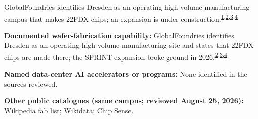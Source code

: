 \begin{minipage}[t][0.90\textheight][t]{\textwidth}
\begin{minipage}[t]{\textwidth}
\begin{minipage}[t]{0.32\textwidth}
\medskip
{\footnotesize GlobalFoundries identifies Dresden as an operating high-volume manufacturing campus that makes 22FDX chips; an expansion is under construction.\nobreak\textsuperscript{\href{\detokenize{https://www.openstreetmap.org/way/10818500}}{\textcolor{accent}{1}},\href{\detokenize{https://investors.gf.com/static-files/ef3116da-5334-46e0-9b6c-56d3e67b1b92}}{\textcolor{accent}{2}},\href{\detokenize{https://gf.com/manufacturing/dresden/}}{\textcolor{accent}{3}},\href{\detokenize{https://gf.com/news-and-events/news/globalfoundries-and-nxp-to-deliver-next-generation-22fdx-solutions-for-automotive-iot-and-smart-mobile/}}{\textcolor{accent}{4}}}\par}
\medskip
{\footnotesize\textbf{Documented wafer-fabrication capability:} GlobalFoundries identifies Dresden as an operating high-volume manufacturing site and states that 22FDX chips are made there; the SPRINT expansion broke ground in 2026.\nobreak\textsuperscript{\href{\detokenize{https://investors.gf.com/static-files/ef3116da-5334-46e0-9b6c-56d3e67b1b92}}{\textcolor{accent}{2}},\href{\detokenize{https://gf.com/manufacturing/dresden/}}{\textcolor{accent}{3}},\href{\detokenize{https://gf.com/news-and-events/news/globalfoundries-and-nxp-to-deliver-next-generation-22fdx-solutions-for-automotive-iot-and-smart-mobile/}}{\textcolor{accent}{4}}}\par}
\end{minipage}
\end{minipage}
\par\vspace{0.65em}
\medskip
{\footnotesize\textbf{Named data-center AI accelerators or programs:} None identified in the sources reviewed.\par}
\smallskip
{\sffamily\scriptsize\color{black!62}\textbf{Other public catalogues (same campus; reviewed August 25, 2026):} \href{\detokenize{https://en.wikipedia.org/w/index.php?title=List_of_semiconductor_fabrication_plants&oldid=1370451124}\#\detokenize{Open_plants}}{Wikipedia fab list}; \href{\detokenize{https://www.wikidata.org/w/index.php?title=Q115408033&oldid=1820322161}}{Wikidata}; \href{\detokenize{https://github.com/aminalav/chip-sense/blob/93d22afe9e1309a7bebd6c7c96541f069f1d67ac/src/data/fab-sites.json}\#\detokenize{L233-L240}}{Chip Sense}.\par}
\medskip

\end{minipage}
